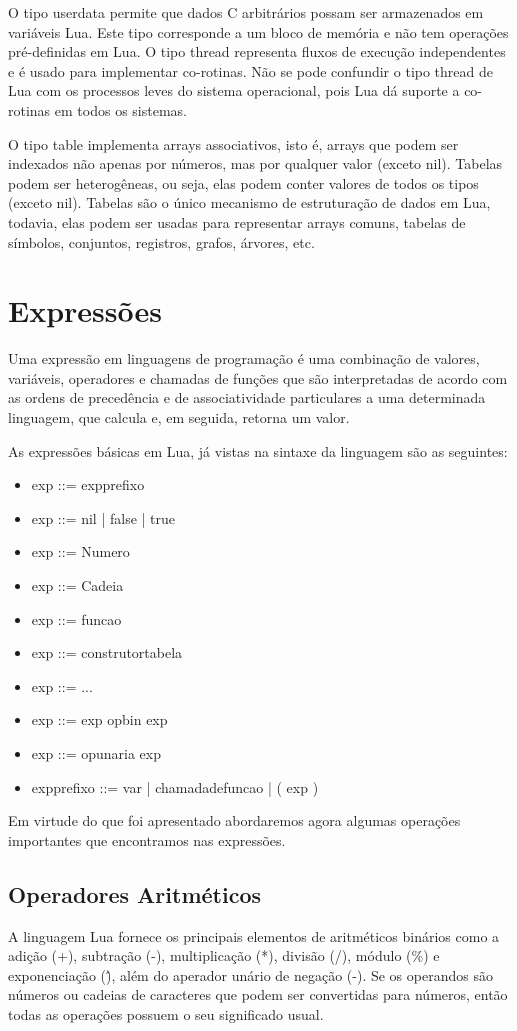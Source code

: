 \documentclass[
12pt, %
openright, %
oneside, %
a4paper, %
english, %
brazil, %
]{abntex2}
\begin{document}
O tipo userdata permite que dados C arbitrários possam ser armazenados em variáveis Lua. Este tipo corresponde a um bloco de memória e não tem operações pré-definidas em Lua. O tipo thread representa fluxos de execução independentes e é usado para implementar co-rotinas. Não se pode confundir o tipo thread de Lua com os processos leves do sistema operacional, pois Lua dá suporte a co-rotinas em todos os sistemas.

O tipo table implementa arrays associativos, isto é, arrays que podem ser indexados não apenas por números, mas por qualquer valor (exceto nil). Tabelas podem ser heterogêneas, ou seja, elas podem conter valores de todos os tipos (exceto nil). Tabelas são o único mecanismo de estruturação de dados em Lua, todavia, elas podem ser usadas para representar arrays comuns, tabelas de símbolos, conjuntos, registros, grafos, árvores, etc.

\chapter{Expressões}
Uma expressão em linguagens de programação é uma combinação de valores, variáveis, operadores e chamadas de funções que são interpretadas de acordo com as ordens de precedência e de associatividade particulares a uma determinada linguagem, que calcula e, em seguida, retorna um valor.

As expressões básicas em Lua, já vistas na sintaxe da linguagem são as seguintes:
\begin{itemize}
\item exp ::= expprefixo
\item exp ::= nil | false | true
\item exp ::= Numero
\item exp ::= Cadeia
\item exp ::= funcao
\item exp ::= construtortabela
\item exp ::= ...
\item exp ::= exp opbin exp
\item exp ::= opunaria exp
\item expprefixo ::= var | chamadadefuncao | ( exp )
\end{itemize}

Em virtude do que foi apresentado abordaremos agora algumas operações importantes que encontramos nas expressões.

\section{Operadores Aritméticos}
A linguagem Lua fornece os principais elementos de aritméticos binários como a adição (+), subtração (-), multiplicação (*), divisão (/), módulo (\%) e exponenciação (\^ ), além do aperador unário de negação (-). Se os operandos são números ou cadeias de caracteres que podem ser convertidas para números, então todas as operações possuem o seu significado usual.
\end{document}
